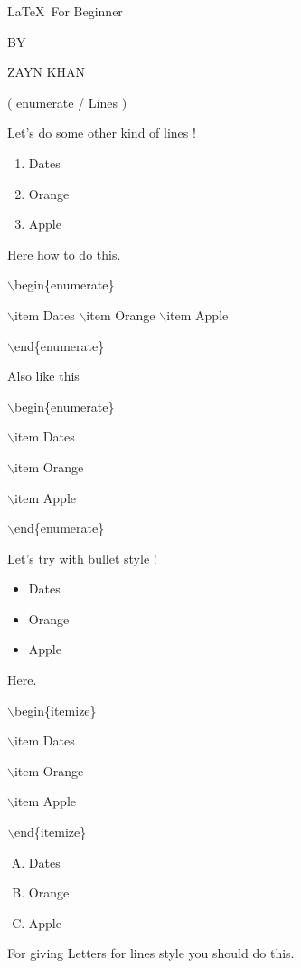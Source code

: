 \documentclass[11pt]{article}
\begin{document}
\begin{center}
\Large \LaTeX\ For Beginner

\small BY

\Large ZAYN KHAN

\large ( enumerate / Lines )
\end{center}


Let's do some other kind of lines !

\begin{enumerate}
\item Dates \item Orange \item Apple
\end{enumerate}

Here how to do this.

$\backslash$begin\{enumerate\}

$\backslash$item Dates
$\backslash$item Orange
$\backslash$item Apple

$\backslash$end\{enumerate\}

Also like this

$\backslash$begin\{enumerate\}

$\backslash$item Dates

$\backslash$item Orange

$\backslash$item Apple

$\backslash$end\{enumerate\}

Let's try with bullet style !

\begin{itemize}
\item Dates \item Orange \item Apple
\end{itemize}

Here.

$\backslash$begin\{itemize\}

$\backslash$item Dates

$\backslash$item Orange

$\backslash$item Apple

$\backslash$end\{itemize\}


\begin{enumerate}[A.]
\item Dates
\item Orange 
\item Apple
\end{enumerate}

For giving Letters for lines style you should do this.
\end{document}
